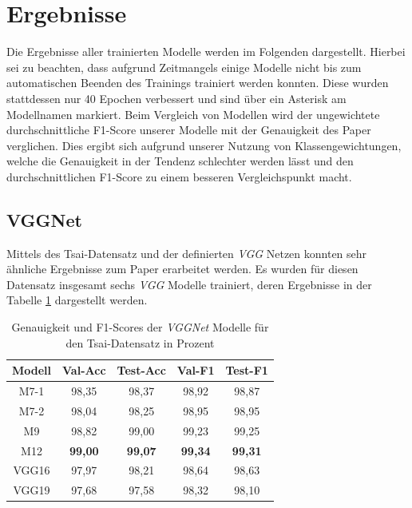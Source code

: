\documentclass[twoside,a4paper]{IEEEtran}
\begin{document}
\section{Ergebnisse} %
Die Ergebnisse aller trainierten Modelle werden im Folgenden dargestellt. Hierbei sei zu beachten, dass aufgrund Zeitmangels einige Modelle nicht bis zum automatischen Beenden des Trainings trainiert werden konnten. Diese wurden stattdessen nur 40 Epochen verbessert und sind über ein Asterisk am Modellnamen markiert. Beim Vergleich von Modellen wird der ungewichtete durchschnittliche F1-Score unserer Modelle mit der Genauigkeit des Paper \cite{RHC} verglichen. Dies ergibt sich aufgrund unserer Nutzung von Klassengewichtungen, welche die Genauigkeit in der Tendenz schlechter werden lässt und den durchschnittlichen F1-Score zu einem besseren Vergleichspunkt macht. 

\subsection{VGGNet}

Mittels des Tsai-Datensatz und der definierten \emph{VGG} Netzen konnten sehr ähnliche Ergebnisse zum Paper \cite{RHC} erarbeitet werden. Es wurden für diesen Datensatz insgesamt sechs \emph{VGG} Modelle trainiert, deren Ergebnisse in der Tabelle \ref{vgg_ergebnis_tsai} dargestellt werden.

\begin{table}[!htb]
	\caption{Genauigkeit und F1-Scores der \emph{VGGNet} Modelle für den Tsai-Datensatz in Prozent}
	\label{vgg_ergebnis_tsai}
	\centering
	\begin{tabular}{|c|c|c|c|c|}
		\hline
		Modell & Val-Acc & Test-Acc & Val-F1 & Test-F1\\
		\hline
		\hline
		M7-1 & 98,35 & 98,37 & 98,92 & 98,87\\
		\hline
		M7-2 & 98,04 & 98,25 & 98,95 & 98,95\\
		\hline
		M9 & 98,82 & 99,00 & 99,23 & 99,25\\
		\hline 
		M12 & \textbf{99,00} & \textbf{99,07} & \textbf{99,34} & \textbf{99,31}\\
		\hline 
		VGG16 & 97,97 & 98,21 & 98,64 & 98,63\\
		\hline 
		VGG19 & 97,68 & 97,58 & 98,32 & 98,10\\
		\hline 
	\end{tabular}
\end{table}
\end{document}
